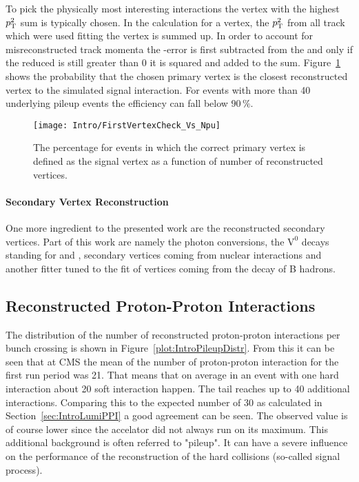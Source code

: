To pick the physically most interesting interactions the vertex with the highest $p_{\mathrm{T}}^{2}$ sum is typically chosen. In the calculation for a vertex, the $p_{\mathrm{T}}^{2}$ from all track which were used fitting the vertex is summed up. In order to account for misreconstructed track momenta the \pt-error is first subtracted from the \pt and only if the reduced \pt is still greater than 0 it is squared and added to the sum. Figure~\ref{plot:IntroSigVertexProb} shows the probability that the chosen primary vertex is the closest reconstructed vertex to the simulated signal interaction. For events with more than 40 underlying pileup events the efficiency can fall below $90\,{}\%{}$.

\begin{figure}[!Hhtb]
    \centering
    \texttt{[image: Intro/FirstVertexCheck\_Vs\_Npu]}
    \caption[Probability to define the correct vertex as signal]{The percentage for events in which the correct primary vertex is defined as the signal vertex as a function of number of reconstructed vertices. \label{plot:IntroSigVertexProb}}
\end{figure}

\paragraph{Secondary Vertex Reconstruction}

One more ingredient to the presented work are the reconstructed secondary vertices. Part of this work are namely the photon conversions, the $\text{V}^{\text{0}}$ decays standing for \PKzS{} and \PgL{}, secondary vertices coming from nuclear interactions and another fitter tuned to the fit of vertices coming from the decay of B hadrons.




\subsection{Reconstructed Proton-Proton Interactions}

The distribution of the number of reconstructed proton-proton interactions per bunch crossing is shown in Figure~\ref{plot:IntroPileupDistr}. From this it can be seen that at CMS the mean of the number of proton-proton interaction for the first run period was 21. That means that on average in an event with one hard interaction about 20 soft interaction happen. The tail reaches up to 40 additional interactions. Comparing this to the expected number of 30 as calculated in Section~\ref{sec:IntroLumiPPI} a good agreement can be seen. The observed value is of course lower since the accelator did not always run on its maximum. This additional background is often referred to "pileup". It can have a severe influence on the performance of the reconstruction of the hard collisions (so-called signal process).

